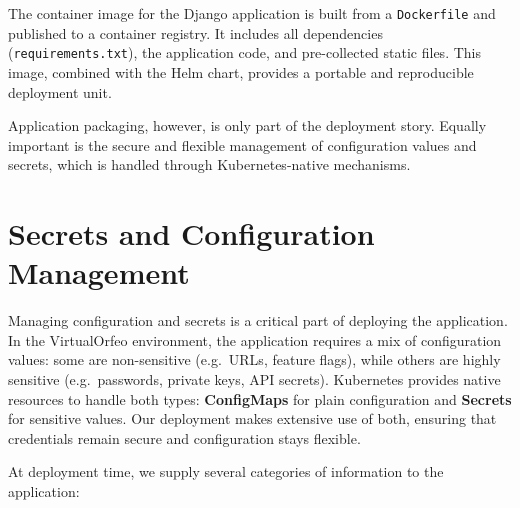 \medskip

The container image for the Django application is built from a \texttt{Dockerfile} 
and published to a container registry. It includes all dependencies 
(\texttt{requirements.txt}), the application code, and pre-collected static 
files. This image, combined with the Helm chart, provides a portable and 
reproducible deployment unit.

\medskip
\noindent Application packaging, however, is only part of the deployment story. 
Equally important is the secure and flexible management of configuration values 
and secrets, which is handled through Kubernetes-native mechanisms.


\section{Secrets and Configuration Management}

Managing configuration and secrets is a critical part of deploying the application. In the VirtualOrfeo environment, the application requires a mix of configuration values: some are non-sensitive (e.g.\ URLs, feature flags), while others are highly sensitive (e.g.\ passwords, private keys, API secrets). Kubernetes provides native resources to handle both types: \textbf{ConfigMaps} for plain configuration and \textbf{Secrets} for sensitive values. Our deployment makes extensive use of both, ensuring that credentials remain secure and configuration stays flexible.

\medskip

At deployment time, we supply several categories of information to the application:

